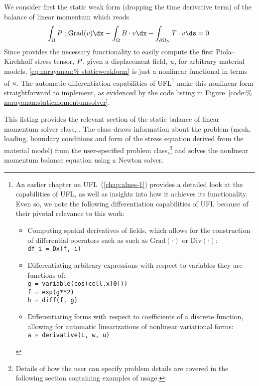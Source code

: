 We consider first the static weak form (dropping the time derivative
term) of the balance of linear momentum which reads%
\begin{equation}
  \int_{\Omega} \bP:\mathrm{Grad}(\bv) \dx - \int_{\Omega} \bB
  \cdot \bv \dx -  \int_{\partial\Omega_{\mathrm{N}}} \bT \cdot
  \bv \ds = 0.
\label{eq:narayanan:staticweakform}%
\end{equation}
Since \twist{} provides the necessary functionality to easily compute
the first Piola--Kirchhoff stress tensor, $\mbox{$ P$}$, given a displacement
field, $\mbox{$ u$}$, for arbitrary material models, \eqref{eq:narayanan:%
staticweakform} is just a nonlinear functional in terms of $\mbox{$ u$}$. The
automatic differentiation capabilities of UFL\footnote{An earlier
  chapter on UFL~(\ref{chap:alnes-1}) provides a detailed look at the
  capabilities of UFL, as well as insights into how it achieves its
  functionality. Even so, we note the following differentiation
  capabilities of UFL because of their pivotal relevance to this work:
  \begin{itemize}
  \item Computing spatial derivatives of fields, which allows for the
    construction of differential operators such as such as
    $\mathrm{Grad(\cdot)}$ or $\mathrm{Div(\cdot)}$:\\
    \texttt{df\_i = Dx(f, i)}
  \item Differentiating arbitrary expressions with respect to variables
    they are functions of:\\
    \texttt{g = variable(cos(cell.x[0]))}\\
    \texttt{f = exp(g**2)}\\
    \texttt{h = diff(f, g)}
  \item Differentiating forms with respect to coefficients of a discrete
    function, allowing for automatic linearizations of nonlinear
    variational forms:\\
    \texttt{a = derivative(L, w, u)}
  \end{itemize}} make this nonlinear form straightforward to
implement, as evidenced by the code listing in Figure~\ref{code:%
narayanan:staticmomentumsolver}.%

This listing provides the relevant section of the static balance of
linear momentum solver class, . The
class draws information about the problem (mesh, loading, boundary
conditions and form of the stress equation derived from the material
model) from the user-specified problem class,\footnote{Details of how
the user can specify problem details are covered in the following
section containing examples of \twist{} usage.} and solves the
nonlinear momentum balance equation using a Newton solver.

